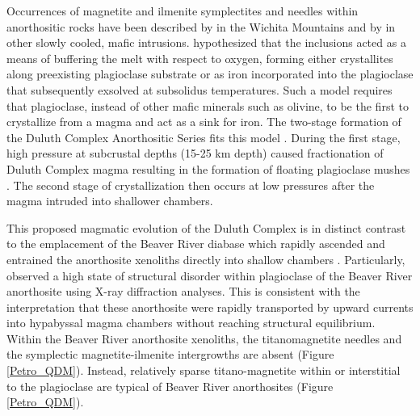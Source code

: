\documentclass[draft]{agujournal2019}
\begin{document}
Occurrences of magnetite and ilmenite symplectites and needles within anorthositic rocks have been described by  in the Wichita Mountains and by  in other slowly cooled, mafic intrusions.  hypothesized that the inclusions acted as a means of buffering the melt with respect to oxygen, forming either crystallites along preexisting plagioclase substrate or as iron incorporated into the plagioclase that subsequently exsolved at subsolidus temperatures. Such a model requires that plagioclase, instead of other mafic minerals such as olivine, to be the first to crystallize from a magma and act as a sink for iron. The two-stage formation of the Duluth Complex Anorthositic Series fits this model \cite{Miller1990a}. During the first stage, high pressure at subcrustal depths (15-25 km depth) caused fractionation of Duluth Complex magma resulting in the formation of floating plagioclase mushes \cite{Kushiro1980a}. The second stage of crystallization then occurs at low pressures after the magma intruded into shallower chambers. 

This proposed magmatic evolution of the Duluth Complex is in distinct contrast to the emplacement of the Beaver River diabase which rapidly ascended and entrained the anorthosite xenoliths directly into shallow chambers \cite{Flower1980a, Miller1997a, Zhang2021b}. Particularly,  observed a high state of structural disorder within plagioclase of the Beaver River anorthosite using X-ray diffraction analyses. This is consistent with the interpretation that these anorthosite were rapidly transported by upward currents into hypabyssal magma chambers without reaching structural equilibrium. Within the Beaver River anorthosite xenoliths, the titanomagnetite needles and the symplectic magnetite-ilmenite intergrowths are absent (Figure \ref{Petro_QDM}). Instead, relatively sparse titano-magnetite within or interstitial to the plagioclase are typical of Beaver River anorthosites (Figure \ref{Petro_QDM}). 
\end{document}
